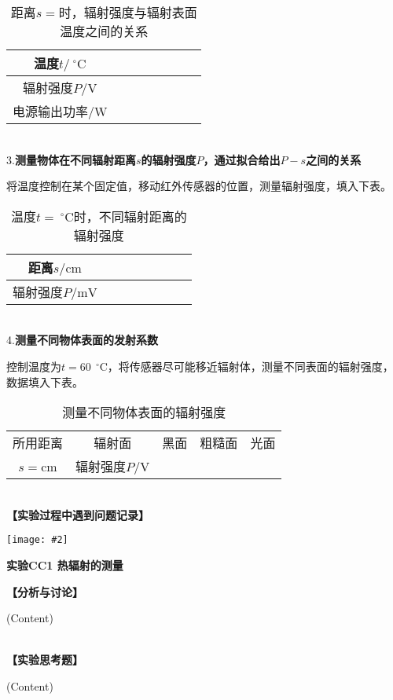 \documentclass[11pt,a4paper]{ctexart}
\newcommand{\ExpeName}{实验CC1 热辐射的测量}
\newcommand{\cpic}[2]{
\begin{center}
\texttt{[image: \#2]}
\end{center}
}
\newcommand{\degreeC}{\ ^\circ \mathrm{C}}  %
\newcommand{\emptyline}{\par \ \\}
\begin{document}
\begin{table}[H]
\centering
\caption{距离$s = $\uline{\hspace{2cm}}时，辐射强度与辐射表面温度之间的关系}
\label{t4}
\begin{tabular}{|c|p{12mm}|p{12mm}|p{12mm}|p{12mm}|p{12mm}|p{12mm}|p{12mm}|}
\hline
温度$t/\degreeC$ &  &  &  &  &  &  &  \\ \hline
辐射强度$P/\mathrm{V}$ &  &  &  &  &  &  &  \\ \hline
电源输出功率/W &  &  &  &  &  &  &  \\ \hline
\end{tabular}
\end{table}
\emptyline
3.\textbf{测量物体在不同辐射距离$s$的辐射强度$P$，通过拟合给出$P-s$之间的关系}\par
将温度控制在某个固定值，移动红外传感器的位置，测量辐射强度，填入下表。
\begin{table}[H]
\centering
\caption{温度$t = $\uline{\hspace{2cm}}$\degreeC$时，不同辐射距离的辐射强度}
\label{t5}
\begin{tabular}{|c||p{12mm}|p{12mm}|p{12mm}|p{12mm}|p{12mm}|p{12mm}|p{12mm}|}
\hline
距离$s/\mathrm{cm}$ &  &  &  &  &  &  &  \\ \hline
辐射强度$P/\mathrm{mV}$ &  &  &  &  &  &  &  \\ \hline
\end{tabular}
\end{table}
\emptyline
4.\textbf{测量不同物体表面的发射系数}\par
控制温度为$t = 60\ \degreeC$，将传感器尽可能移近辐射体，测量不同表面的辐射强度，数据填入下表。
\begin{table}[H]
\centering
\caption{测量不同物体表面的辐射强度}
\label{t6}
\begin{tabular}{|c|c|p{12mm}|p{12mm}|p{12mm}|}
\hline
所用距离 & 辐射面 & 黑面 & 粗糙面 & 光面 \\ \cline{2-5} 
$s = $\uline{\hspace{15mm}}cm & 辐射强度$P/\mathrm{V}$ &  &  &  \\ \hline
\end{tabular}
\end{table}
\emptyline
\textbf{【实验过程中遇到问题记录】}

%

\newpage%
\cpic{0.255}{e3}%
\begin{center}
\LARGE\textbf{{\ExpeName}}
\end{center}
\textbf{【分析与讨论】}\par
(Content)
\emptyline
\textbf{【实验思考题】}\par
(Content)
\end{document}
